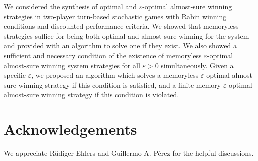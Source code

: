 \documentclass[runningheads,a4paper]{llncs}
\begin{document}
We considered the synthesis of optimal and $\varepsilon$-optimal almost-sure winning strategies in two-player turn-based stochastic games with Rabin winning conditions and discounted performance criteria. We showed that memoryless strategies suffice for being both optimal and almost-sure winning for the system and provided with an algorithm to solve one if they exist. We also showed a sufficient and necessary condition of the existence of memoryless $\varepsilon$-optimal almost-sure winning system strategies for all $\varepsilon > 0$ simultaneously. 
Given a specific $\varepsilon$, we proposed an algorithm which solves a memoryless $\varepsilon$-optimal almost-sure winning strategy if this condition is satisfied, and a finite-memory $\varepsilon$-optimal almost-sure winning strategy if this condition is violated. 






\section*{Acknowledgements}
We appreciate R{\"u}diger Ehlers and Guillermo A. P{\'e}rez for the helpful discussions. 



\end{document}
